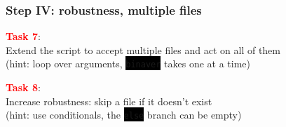 \documentclass[unknownkeysallowed, 10pt, a4 paper, handout]{beamer}
\newcommand{\focus}[1]{\textbf{\textcolor{red}{#1}}}
\newcommand{\code}[1]{\colorbox{black}{\color{green}\texttt{#1}}}
\begin{document}
\begin{frame}
	\begin{center}
		\frametitle{Step IV: robustness, multiple files}

		\focus{Task 7}:\\
		Extend the script to accept multiple files and act on all of them\\
		(hint: loop over arguments, \code{binaver} takes one at a time)

		\vspace{8mm}

		\focus{Task 8}:\\
		Increase robustness: skip a file if it doesn't exist\\
		(hint: use conditionals, the \code{else} branch can be empty)
	\end{center}
\end{frame}
\end{document}
